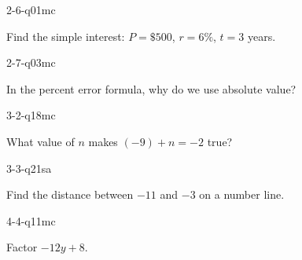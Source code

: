 \begin{practiceQuestion}{2-6-q01}{mc}
\begin{questionText}
Find the simple interest: $P = \$500$, $r = 6\%$, $t = 3$ years.
\end{questionText}
\end{practiceQuestion}

\begin{practiceQuestion}{2-7-q03}{mc}
\begin{questionText}
In the percent error formula, why do we use absolute value?
\end{questionText}
\end{practiceQuestion}

\begin{practiceQuestion}{3-2-q18}{mc}
\begin{questionText}
What value of $n$ makes $(-9) + n = -2$ true?
\end{questionText}
\end{practiceQuestion}

\begin{practiceQuestion}{3-3-q21}{sa}
\begin{questionText}
Find the distance between $-11$ and $-3$ on a number line.
\end{questionText}
\end{practiceQuestion}

\begin{practiceQuestion}{4-4-q11}{mc}
\begin{questionText}
Factor $-12y + 8$.
\end{questionText}
\end{practiceQuestion}

